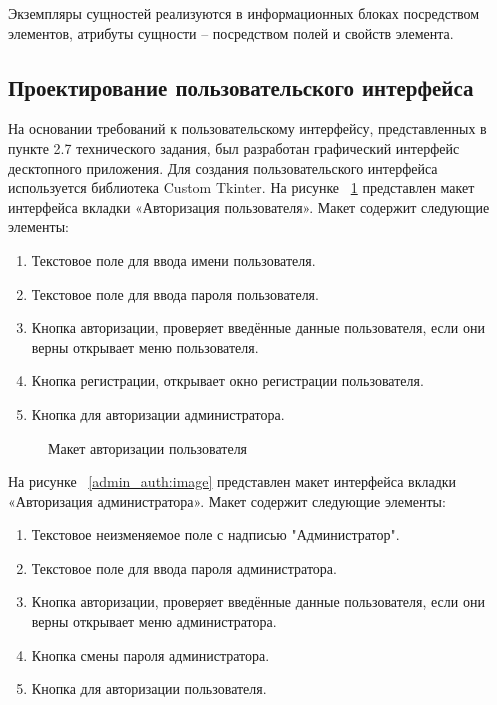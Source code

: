 Экземпляры сущностей реализуются в информационных блоках посредством элементов, атрибуты сущности – посредством полей и свойств элемента. 

\subsection{Проектирование пользовательского интерфейса}

На основании требований к пользовательскому интерфейсу, представленных в пункте 2.7 технического задания, был разработан графический интерфейс десктопного приложения. Для создания пользовательского
интерфейса используется библиотека Custom Tkinter.
На рисунке ~\ref{user_auth:image} представлен макет интерфейса вкладки «Авторизация пользователя». Макет содержит следующие элементы:
\begin{enumerate}
	\item Текстовое поле для ввода имени пользователя.
	\item Текстовое поле для ввода пароля пользователя.
	\item Кнопка авторизации, проверяет введённые данные пользователя, если они верны открывает меню пользователя.
	\item Кнопка регистрации, открывает окно регистрации пользователя.
	\item Кнопка для авторизации администратора. 
\end{enumerate}

\begin{figure}[H]
	\caption{Макет авторизации пользователя}
	\label{user_auth:image}
\end{figure}

На рисунке ~\ref{admin_auth:image} представлен макет интерфейса вкладки «Авторизация администратора». Макет содержит следующие элементы:
\begin{enumerate}
	\item Текстовое неизменяемое поле с надписью "Администратор".
	\item Текстовое поле для ввода пароля администратора.
	\item Кнопка авторизации, проверяет введённые данные пользователя, если они верны открывает меню администратора.
	\item Кнопка смены пароля администратора.
	\item Кнопка для авторизации пользователя. 
\end{enumerate}

